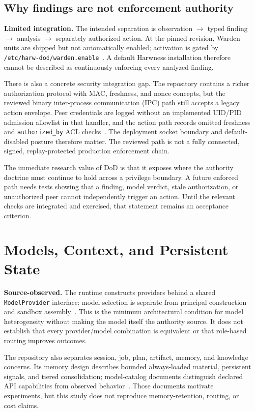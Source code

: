 \subsection{Why findings are not enforcement authority}

\textbf{Limited integration.} The intended separation is observation $\rightarrow$ typed finding $\rightarrow$ analysis $\rightarrow$ separately authorized action. At the pinned revision, Warden units are shipped but not automatically enabled; activation is gated by \texttt{/etc/harw-dod/warden.enable}~\cite{ref7}. A default Harwness installation therefore cannot be described as continuously enforcing every analyzed finding.

There is also a concrete security integration gap. The repository contains a richer authorization protocol with MAC, freshness, and nonce concepts, but the reviewed binary inter-process communication (IPC) path still accepts a legacy action envelope. Peer credentials are logged without an implemented UID/PID admission allowlist in that handler, and the action path records omitted freshness and \texttt{authorized\_by} ACL checks~\cite{ref41,ref42}. The deployment socket boundary and default-disabled posture therefore matter. The reviewed path is not a fully connected, signed, replay-protected production enforcement chain.

The immediate research value of DoD is that it exposes where the authority doctrine must continue to hold across a privilege boundary. A future enforced path needs tests showing that a finding, model verdict, stale authorization, or unauthorized peer cannot independently trigger an action. Until the relevant checks are integrated and exercised, that statement remains an acceptance criterion.

\section{Models, Context, and Persistent State}
\label{sec:models}

\textbf{Source-observed.} The runtime constructs providers behind a shared \texttt{ModelProvider} interface; model selection is separate from principal construction and sandbox assembly~\cite{ref43}. This is the minimum architectural condition for model heterogeneity without making the model itself the authority source. It does not establish that every provider/model combination is equivalent or that role-based routing improves outcomes.

The repository also separates session, job, plan, artifact, memory, and knowledge concerns. Its memory design describes bounded always-loaded material, persistent signals, and tiered consolidation; model-catalog documents distinguish declared API capabilities from observed behavior~\cite{ref44,ref45}. Those documents motivate experiments, but this study does not reproduce memory-retention, routing, or cost claims.

